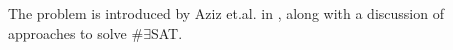 The problem is introduced by Aziz et.al. in \cite{aziz15}, along with a discussion of approaches to solve \#$\exists$SAT. 


